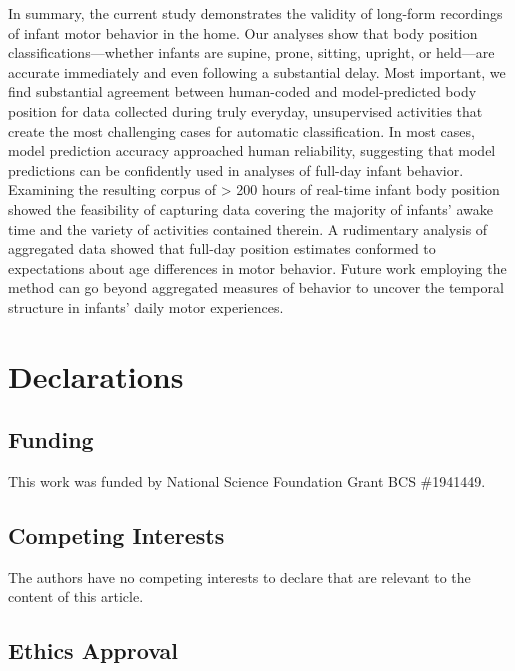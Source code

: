 \documentclass[
  man]{apa6}
\begin{document}
In summary, the current study demonstrates the validity of long-form recordings of infant motor behavior in the home. Our analyses show that body position classifications---whether infants are supine, prone, sitting, upright, or held---are accurate immediately and even following a substantial delay. Most important, we find substantial agreement between human-coded and model-predicted body position for data collected during truly everyday, unsupervised activities that create the most challenging cases for automatic classification. In most cases, model prediction accuracy approached human reliability, suggesting that model predictions can be confidently used in analyses of full-day infant behavior. Examining the resulting corpus of \textgreater{} 200 hours of real-time infant body position showed the feasibility of capturing data covering the majority of infants' awake time and the variety of activities contained therein. A rudimentary analysis of aggregated data showed that full-day position estimates conformed to expectations about age differences in motor behavior. Future work employing the method can go beyond aggregated measures of behavior to uncover the temporal structure in infants' daily motor experiences.

\newpage

\hypertarget{declarations}{%
\section{Declarations}\label{declarations}}

\hypertarget{funding}{%
\subsection{Funding}\label{funding}}

This work was funded by National Science Foundation Grant BCS \#1941449.

\hypertarget{competing-interests}{%
\subsection{Competing Interests}\label{competing-interests}}

The authors have no competing interests to declare that are relevant to the content of this article.

\hypertarget{ethics-approval}{%
\subsection{Ethics Approval}\label{ethics-approval}}
\end{document}
